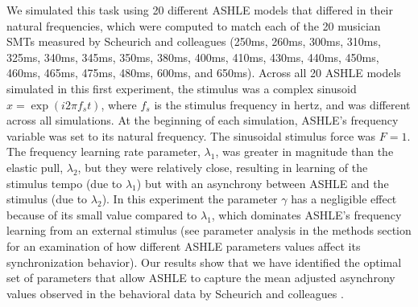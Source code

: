 \documentclass{report}
\begin{document}
We simulated this task using 20 different ASHLE models that differed in their natural frequencies, which were computed to match each of the 20 musician SMTs measured by Scheurich and colleagues \cite{scheurich2018tapping} (250ms, 260ms, 300ms, 310ms, 325ms, 340ms, 345ms, 350ms, 380ms, 400ms, 410ms, 430ms, 440ms, 450ms, 460ms, 465ms, 475ms, 480ms, 600ms, and 650ms). Across all 20 ASHLE models simulated in this first experiment, the stimulus was a complex sinusoid $x=\exp(i2\pi f_s t)$, where $f_s$ is the stimulus frequency in hertz, and was different across all simulations. At the beginning of each simulation, ASHLE's frequency variable was set to its natural frequency. The sinusoidal stimulus force was $F=1$. The frequency learning rate parameter, $\lambda_1$, was greater in magnitude than the elastic pull, $\lambda_2$, but they were relatively close, resulting in learning of the stimulus tempo (due to $\lambda_1$) but with an asynchrony between ASHLE and the stimulus (due to $\lambda_2$). In this experiment the parameter $\gamma$ has a negligible effect because of its small value compared to $\lambda_1$, which dominates ASHLE's frequency learning from an external stimulus (see parameter analysis in the methods section for an examination of how different ASHLE parameters values affect its synchronization behavior). Our results show that we have identified the optimal set of parameters that allow ASHLE to capture the mean adjusted asynchrony values observed in the behavioral data by Scheurich and colleagues \cite{scheurich2018tapping}.
\end{document}
